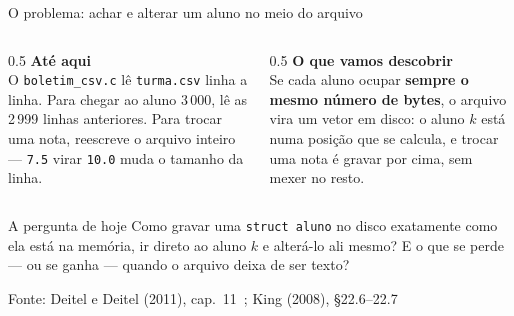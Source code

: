 \documentclass[aspectratio=169]{beamer}
\newcommand{\fonte}[1]{\vfill\hfill{\scriptsize\textcolor{UFSGray}{Fonte: #1}}}
\begin{document}
\begin{frame}{O problema: achar e alterar um aluno no meio do arquivo}
  \vspace{-0.4em}
  \begin{columns}[T]
    \begin{column}{0.5\textwidth}
      \textbf{Até aqui}\\[0.3em]
      \small
      O \texttt{boletim\_csv.c} lê \texttt{turma.csv} linha a linha. Para
      chegar ao aluno 3\,000, lê as 2\,999 linhas anteriores. Para trocar
      uma nota, reescreve o arquivo inteiro --- \texttt{7.5} virar
      \texttt{10.0} muda o tamanho da linha.
    \end{column}
    \begin{column}{0.5\textwidth}
      \textbf{O que vamos descobrir}\\[0.3em]
      \small
      Se cada aluno ocupar \textbf{sempre o mesmo número de bytes}, o
      arquivo vira um vetor em disco: o aluno $k$ está numa posição que se
      calcula, e trocar uma nota é gravar por cima, sem mexer no resto.
    \end{column}
  \end{columns}
  \medskip
  \begin{block}{A pergunta de hoje}
    Como gravar uma \texttt{struct aluno} no disco exatamente como ela está
    na memória, ir direto ao aluno $k$ e alterá-lo ali mesmo? E o que se
    perde --- ou se ganha --- quando o arquivo deixa de ser texto?
  \end{block}
  \fonte{Deitel e Deitel (2011), cap.~11~\cite{deitel2011como};
    King (2008), §22.6--22.7~\cite{king2008c}}
\end{frame}
\end{document}
